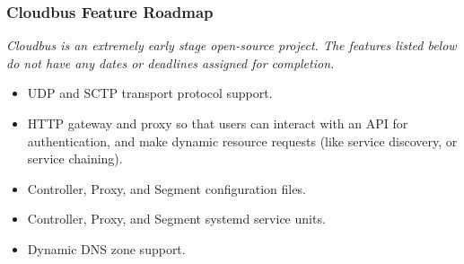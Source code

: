 \begin{frame}
	\frametitle{Cloudbus Feature Roadmap}
	\emph{Cloudbus is an extremely early stage open-source project. The features listed below do not have any dates or deadlines assigned for 
	completion.}\vspace{1em}
	\begin{itemize}
		\item UDP and SCTP transport protocol support.
		\item HTTP gateway and proxy so that users can interact with an API for authentication, and make dynamic resource requests (like service %
		discovery, or service chaining).
		\item Controller, Proxy, and Segment configuration files.
		\item Controller, Proxy, and Segment systemd service units.
		\item Dynamic DNS zone support.
		
	\end{itemize}
\end{frame}